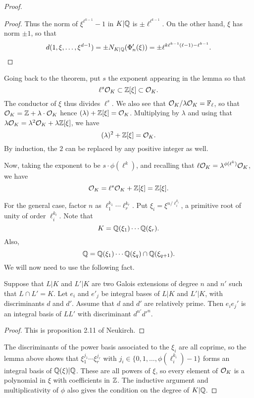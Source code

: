 \begin{proof}
\begin{proof}
    Thus the norm of $\xi^{\ell^{k-1}}-1$ in $K|\mathbb{Q}$ is $\pm \ell^{\ell^{k-1}}$.
    On the other hand, $\xi$ has norm $\pm 1$, so that
    \[ d(1,\xi,\ldots,\xi^{d-1}) = \pm N_{K|\mathbb{Q}}(\Phi_{n}'(\xi)) = \pm \ell^{k\ell^{k-1}(\ell-1)-\ell^{k-1}}. \]
  \end{proof}

  Going back to the theorem, put $s$ the exponent appearing in the lemma so that
  \[ \ell^{s} \mathcal{O}_{K} \subset \mathbb{Z}[\xi] \subset \mathcal{O}_{K}. \]
  The conductor of $\xi$ thus divides $\ell^{s}$.
  We also see that $\mathcal{O}_{K}/\lambda\mathcal{O}_{K} = \mathbb{F}_{\ell}$, so that $\mathcal{O}_{K} = \mathbb{Z} + \lambda \cdot \mathcal{O}_{K}$ hence $(\lambda) + \mathbb{Z}[\xi] = \mathcal{O}_{K}$.
  Multiplying by $\lambda$ and using that $\lambda \mathcal{O}_{K} = \lambda^{2} \mathcal{O}_{K} + \lambda \mathbb{Z}[\xi]$, we have
  \[ (\lambda)^{2} + \mathbb{Z}[\xi] = \mathcal{O}_{K}. \]
  By induction, the $2$ can be replaced by any positive integer as well.

  Now, taking the exponent to be $s \cdot \phi(\ell^{k})$, and recalling that $\ell \mathcal{O}_{K} = \lambda^{\phi(\ell^{k})} \mathcal{O}_{K}$, we have
  \[ \mathcal{O}_{K} = \ell^{s} \mathcal{O}_{K} + \mathbb{Z}[\xi] = \mathbb{Z}[\xi]. \]

  For the general case, factor $n$ as $\ell_{1}^{k_{1}} \cdots \ell_{r}^{k_{r}}$.
  Put $\xi_{i} = \xi^{n/\ell_{i}^{k_{i}}}$, a primitive root of unity of order $\ell_{i}^{k_{i}}$.
  Note that
  \[ K = \mathbb{Q}(\xi_{1}) \cdots \mathbb{Q}(\xi_{r}). \]
  Also,
  \[ \mathbb{Q} = \mathbb{Q}(\xi_{1}) \cdots \mathbb{Q}(\xi_{q}) \cap \mathbb{Q}(\xi_{q+1}). \]
  We will now need to use the following fact.
  \begin{lemma}
    Suppose that $L|K$ and $L'|K$ are two Galois extensions of degree $n$ and $n'$ such that $L \cap L' = K$.
    Let $e_{i}$ and $e'_{j}$ be integral bases of $L|K$ and $L'|K$, with discriminants $d$ and $d'$.
    Assume that $d$ and $d'$ are relatively prime.
    Then $e_{i}e_{j}'$ is an integral basis of $LL'$ with discriminant $d^{n'}d'^{n}$.
  \end{lemma}
  \begin{proof}
    This is proposition 2.11 of Neukirch.
  \end{proof}

  The discriminants of the power basis associated to the $\xi_{i}$ are all coprime, so the lemma above shows that $\xi_{1}^{j_{1}} \cdots \xi_{r}^{j_{r}}$ with $j_{i} \in \{0,1,\ldots,\phi(\ell_{i}^{k_{i}})-1\}$ forms an integral basis of $\mathbb{Q}(\xi)|\mathbb{Q}$.
  These are all powers of $\xi$, so every element of $\mathcal{O}_{K}$ is a polynomial in $\xi$ with coefficients in $\mathbb{Z}$.
  The inductive argument and multiplicativity of $\phi$ also gives the condition on the degree of $K|\mathbb{Q}$.
\end{proof}

